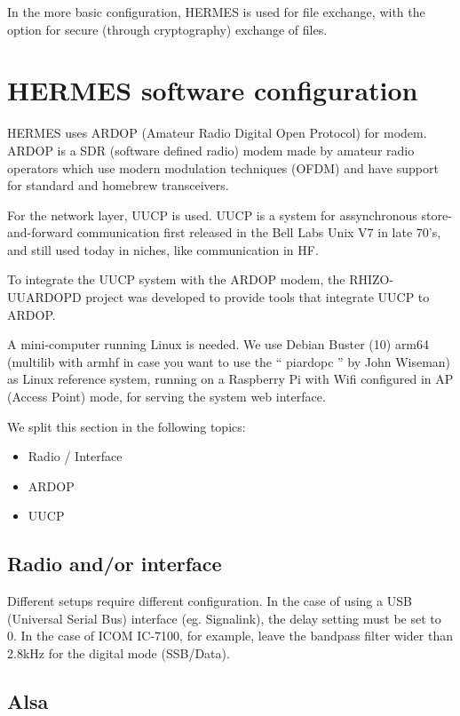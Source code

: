 \documentclass[11pt,a4paper]{article}
\begin{document}
In the more basic configuration, HERMES is used for file exchange, with the
option for secure (through cryptography) exchange of files.

\section{HERMES software configuration}

HERMES uses ARDOP (Amateur Radio Digital Open Protocol) for modem. ARDOP is
a SDR (software defined radio) modem made by amateur radio operators which
use modern modulation techniques (OFDM) and have support for standard and
homebrew transceivers.

For the network layer, UUCP is used. UUCP is a system for assynchronous
store-and-forward communication first released in the Bell Labs Unix V7 in
late 70's, and still used today in niches, like communication in HF.

To integrate the UUCP system with the ARDOP modem, the RHIZO-UUARDOPD
project was developed to provide tools that integrate UUCP to ARDOP.

A mini-computer running Linux is needed. We use Debian Buster (10) arm64
(multilib with armhf in case you want to use the `` piardopc '' by John
Wiseman) as Linux reference system, running on a Raspberry Pi with
Wifi configured in AP (Access Point) mode, for serving the system web
interface.

We split this section in the following topics:
\begin{itemize}
\item Radio / Interface
\item ARDOP
\item UUCP
\end{itemize}

\subsection{Radio and/or interface}

Different setups require different configuration. In the case of using a USB
(Universal Serial Bus) interface (eg. Signalink), the delay setting must be
set to 0. In the case of ICOM IC-7100, for example, leave the bandpass filter wider
than 2.8kHz for the digital mode  (SSB/Data).

\subsection{Alsa}
\end{document}
